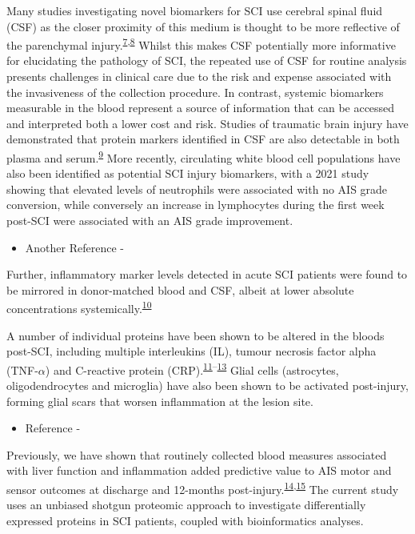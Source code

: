 \documentclass[
]{article}
\providecommand{\tightlist}{%
  \setlength{\itemsep}{0pt}\setlength{\parskip}{0pt}}
\begin{document}
Many studies investigating novel biomarkers for SCI use cerebral spinal fluid (CSF) as the closer proximity of this medium is thought to be more reflective of the parenchymal injury.\textsuperscript{\protect\hyperlink{ref-kwon_neurochemical_2019}{7},\protect\hyperlink{ref-hulme_developing_2017}{8}}
Whilst this makes CSF potentially more informative for elucidating the pathology of SCI, the repeated use of CSF for routine analysis presents challenges in clinical care due to the risk and expense associated with the invasiveness of the collection procedure. In contrast, systemic biomarkers measurable in the blood represent a source of information that can be accessed and interpreted both a lower cost and risk. Studies of traumatic brain injury have demonstrated that protein markers identified in CSF are also detectable in both plasma and serum.\textsuperscript{\protect\hyperlink{ref-wang_update_2018}{9}} More recently, circulating white blood cell populations have also been identified as potential SCI injury biomarkers, with a 2021 study showing that elevated levels of neutrophils were associated with no AIS grade conversion, while conversely an increase in lymphocytes during the first week post-SCI were associated with an AIS grade improvement.

\begin{itemize}
\tightlist
\item
  Another Reference -
\end{itemize}

Further, inflammatory marker levels detected in acute SCI patients were found to be mirrored in donor-matched blood and CSF, albeit at lower absolute concentrations systemically.\textsuperscript{\protect\hyperlink{ref-kwon_cerebrospinal_2010}{10}}

A number of individual proteins have been shown to be altered in the bloods post-SCI, including multiple interleukins (IL), tumour necrosis factor alpha (TNF-\(\alpha\)) and C-reactive protein (CRP).\textsuperscript{\protect\hyperlink{ref-segal_circulating_1997}{11}--\protect\hyperlink{ref-frost_inflammatory_2005}{13}} Glial cells (astrocytes, oligodendrocytes and microglia) have also been shown to be activated post-injury, forming glial scars that worsen inflammation at the lesion site.

\begin{itemize}
\tightlist
\item
  Reference -
\end{itemize}

Previously, we have shown that routinely collected blood measures associated with liver function and inflammation added predictive value to AIS motor and sensor outcomes at discharge and 12-months post-injury.\textsuperscript{\protect\hyperlink{ref-bernardo_harrington_routinely_2020}{14},\protect\hyperlink{ref-brown_preliminary_2019}{15}} The current study uses an unbiased shotgun proteomic approach to investigate differentially expressed proteins in SCI patients, coupled with bioinformatics analyses.
\end{document}
